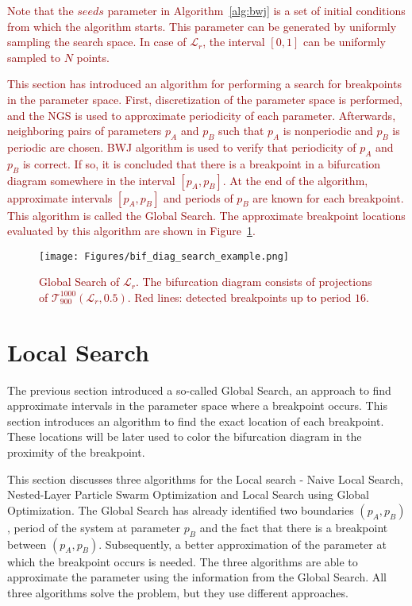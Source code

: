 \textcolor{darkred}{
Note that the $seeds$ parameter in Algorithm~\ref{alg:bwj} is a set of initial conditions from which the algorithm starts.
This parameter can be generated by uniformly sampling the search space.
In case of $\mathcal{L}_{r}$, the interval $[0, 1]$ can be uniformly sampled to $N$ points.
}

\bigskip
\textcolor{darkred}{
This section has introduced an algorithm for performing a search for breakpoints in the parameter space.
First, discretization of the parameter space is performed, and the NGS is used to approximate periodicity of each parameter.
Afterwards, neighboring pairs of parameters $p_{A}$ and $p_{B}$ such that $p_{A}$ is nonperiodic and $p_{B}$ is periodic are chosen.
BWJ algorithm is used to verify that periodicity of $p_{A}$ and $p_{B}$ is correct.
If so, it is concluded that there is a breakpoint in a bifurcation diagram somewhere in the interval $[p_{A}, p_{B}]$.
At the end of the algorithm, approximate intervals $[p_{A}, p_{B}]$ and periods of $p_{B}$ are known for each breakpoint.
This algorithm is called the Global Search.
The approximate breakpoint locations evaluated by this algorithm are shown in Figure~\ref{fig:bif_diag_search_example}.
}

\begin{figure}[!h]
    \centering
    \texttt{[image: Figures/bif\_diag\_search\_example.png]}
    \caption{
        \textcolor{darkred}{
        Global Search of $\mathcal{L}_{r}$.
        The bifurcation diagram consists of projections of $\mathcal{T}_{900}^{1000}(\mathcal{L}_{r}, 0.5)$.
        Red lines: detected breakpoints up to period $16$.
        }
    }
    \label{fig:bif_diag_search_example}
\end{figure}

\section{Local Search}

The previous section introduced a so-called Global Search, an approach to find approximate intervals in the parameter space where a breakpoint occurs.
This section introduces an algorithm to find the exact location of each breakpoint.
These locations will be later used to color the bifurcation diagram in the proximity of the breakpoint.
\par
This section discusses three algorithms for the Local search - Naive Local Search, Nested-Layer Particle Swarm Optimization and Local Search using Global Optimization.
The Global Search has already identified two boundaries $(p_A, p_B)$, period of the system at parameter $p_B$ and the fact that there is a breakpoint between $(p_A, p_B)$.
Subsequently, a better approximation of the parameter at which the breakpoint occurs is needed.
The three algorithms are able to approximate the parameter using the information from the Global Search.
All three algorithms solve the problem, but they use different approaches.

